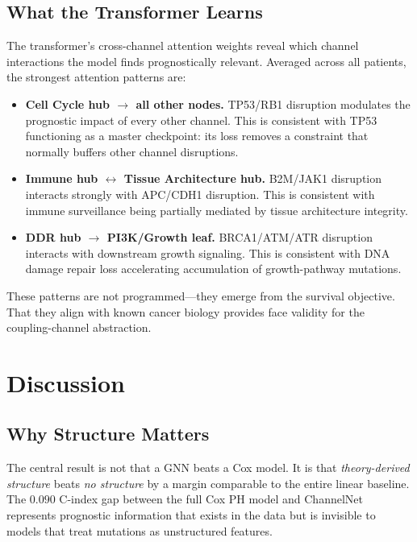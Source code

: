 \documentclass[11pt]{article}
\begin{document}
\subsection{What the Transformer Learns}
\label{sec:attention}

The transformer's cross-channel attention weights reveal which
channel interactions the model finds prognostically relevant.
Averaged across all patients, the strongest attention patterns
are:

\begin{itemize}
\item \textbf{Cell Cycle hub $\to$ all other nodes.} TP53/RB1
   disruption modulates the prognostic impact of every other
   channel. This is consistent with TP53 functioning as a
   master checkpoint: its loss removes a constraint that
   normally buffers other channel disruptions.
\item \textbf{Immune hub $\leftrightarrow$ Tissue Architecture
   hub.} B2M/JAK1 disruption interacts strongly with APC/CDH1
   disruption. This is consistent with immune surveillance
   being partially mediated by tissue architecture integrity.
\item \textbf{DDR hub $\to$ PI3K/Growth leaf.} BRCA1/ATM/ATR
   disruption interacts with downstream growth signaling.
   This is consistent with DNA damage repair loss accelerating
   accumulation of growth-pathway mutations.
\end{itemize}

These patterns are not programmed---they emerge from the
survival objective. That they align with known cancer biology
provides face validity for the coupling-channel abstraction.

\section{Discussion}
\label{sec:discussion}

\subsection{Why Structure Matters}

The central result is not that a GNN beats a Cox model. It is
that \emph{theory-derived structure} beats \emph{no structure}
by a margin comparable to the entire linear baseline. The
$0.090$ C-index gap between the full Cox PH model and ChannelNet
represents prognostic information that exists in the data but is
invisible to models that treat mutations as unstructured features.
\end{document}

